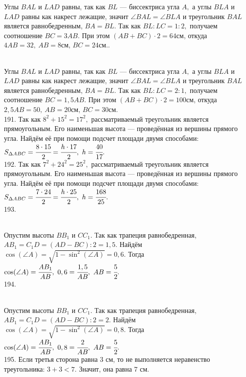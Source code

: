 Углы $BAL$ и $LAD$ равны, так как $BL$ --- биссектриса угла $A,$ а углы $BLA$ и $LAD$ равны как накрест лежащие, значит $\angle BAL=\angle BLA$ и треугольник $BAL$ является равнобедренным, $BA=BL.$ Так как $BL:LC=1:2,$ получаем соотношение $BC=3AB.$ При этом $(AB+BC)\cdot2=64$см, откуда $4AB=32,\ AB=8$см, $BC=24$см.\newpage{}. \begin{figure}[ht!]
\end{figure}\\
Углы $BAL$ и $LAD$ равны, так как $BL$ --- биссектриса угла $A,$ а углы $BLA$ и $LAD$ равны как накрест лежащие, значит $\angle BAL=\angle BLA$ и треугольник $BAL$ является равнобедренным, $BA=BL.$ Так как $BL:LC=2:1,$ получаем соотношение $BC=1,5AB.$ При этом $(AB+BC)\cdot2=100$см, откуда $2,5AB=50,\ AB=20$см, $BC=30$см.\\
191. Так как $8^2+15^2=17^2,$ рассматриваемый треугольник является прямоугольным. Его наименьшая высота --- проведённая из вершины прямого угла. Найдём её при помощи подсчет площади двумя способами: $S_{\Delta ABC}=\cfrac{8\cdot15}{2}=\cfrac{h\cdot17}{2},\ h=\cfrac{40}{17}.$\\
192. Так как $7^2+24^2=25^2,$ рассматриваемый треугольник является прямоугольным. Его наименьшая высота --- проведённая из вершины прямого угла. Найдём её при помощи подсчет площади двумя способами: $S_{\Delta ABC}=\cfrac{7\cdot24}{2}=\cfrac{h\cdot25}{2},\ h=\cfrac{168}{25}.$\\
193. \begin{figure}[ht!]
\end{figure}\\
Опустим высоты $BB_1$ и $CC_1.$ Так как трапеция равнобедренная, $AB_1=C_1D=(AD-BC):2=1,5.$ Найдём $\cos(\angle A)=\sqrt{1-\sin^2(\angle A)}=0,6.$ Тогда
$\cos(\angle A)=\cfrac{AB_1}{AB},\ 0,6=\cfrac{1,5}{AB},\ AB=\cfrac{5}{2}.$\\
194. \begin{figure}[ht!]
\end{figure}\\
Опустим высоты $BB_1$ и $CC_1.$ Так как трапеция равнобедренная, $AB_1=C_1D=(AD-BC):2=2.$ Найдём $\cos(\angle A)=\sqrt{1-\sin^2(\angle A)}=0,8.$ Тогда
$\cos(\angle A)=\cfrac{AB_1}{AB},\ 0,8=\cfrac{2}{AB},\ AB=\cfrac{5}{2}.$\\
195. Если третья сторона равна 3 см, то не выполняется неравенство треугольника: $3+3<7.$ Значит, она равна 7 см.\\
